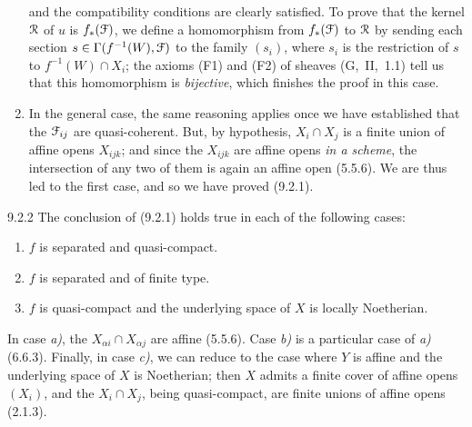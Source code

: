 \documentclass[../main.tex]{subfiles}
\begin{document}
\begin{enumerate}[label=\alph*)]
\begin{equation*}
        \end{equation*}
        and the compatibility conditions are clearly satisfied.
        To prove that the kernel $\mathcal{R}$ of $u$ is $f_*(\mathcal{F})$, we define a homomorphism from $f_*(\mathcal{F})$ to $\mathcal{R}$ by sending each section $s\in\Gamma(f^{-1}(W), \mathcal{F})$ to the family $(s_i)$, where $s_i$ is the restriction of $s$ to $f^{-1}(W)\cap X_i$; the axioms (F1) and (F2) of sheaves (G,~II,~1.1) tell us that this homomorphism is \emph{bijective}, which finishes the proof in this case.
    \item In the general case, the same reasoning applies once we have established that the $\mathcal{F}_{ij}$ are quasi-coherent.
    But, by hypothesis, $X_i\cap X_j$ is a finite union of affine opens $X_{ijk}$; and since the $X_{ijk}$ are affine opens \emph{in a scheme}, the intersection of any two of them is again an affine open (5.5.6).
    We are thus led to the first case, and so we have proved (9.2.1).
\end{enumerate}

\begin{cx}[Corollary]{9.2.2}
    The conclusion of {\normalfont(9.2.1)} holds true in each of the following cases:
    \begin{enumerate}[label=\alph*)]
        \item $f$ is separated and quasi-compact.
        \item $f$ is separated and of finite type.
        \item $f$ is quasi-compact and the underlying space of $X$ is locally Noetherian.
    \end{enumerate}
\end{cx}

In case \emph{a)}, the $X_{\alpha i}\cap X_{\alpha j}$ are affine (5.5.6).
Case \emph{b)} is a particular case of \emph{a)} (6.6.3).
Finally, in case \emph{c)}, we can reduce to the case where $Y$ is affine and the underlying space of $X$ is Noetherian; then $X$ admits a finite cover of affine opens $(X_i)$, and the $X_i\cap X_j$, being quasi-compact, are finite unions of affine opens (2.1.3).
\end{document}
